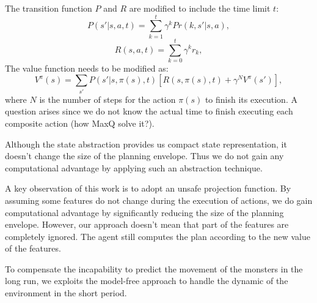 The transition function $P$ and $R$ are modified to include the time limit $t$:
\begin{equation}
    P(s'|s, a, t) = \sum^t_{k=1} \gamma^k Pr(k, s'|s, a),
\end{equation}
\begin{equation}
    R(s, a, t) = \sum^t_{k=0} \gamma^k r_k,
\end{equation}
The value function needs to be modified as:
\begin{equation}
    V^{\pi}(s) = \sum_{s'}P(s'|s, \pi(s), t)[R(s, \pi(s), t) + \gamma^N V^{\pi}(s')],
\end{equation}
where $N$ is the number of steps for the action $\pi(s)$ to finish its execution.
A question arises since we do not know the actual time to finish executing each composite action (how MaxQ solve it?).

Although the state abstraction provides us compact state representation, 
it doesn't change the size of the planning envelope. Thus we do not gain any computational
advantage by applying such an abstraction technique.

A key observation of this work is to adopt an unsafe projection function. By assuming 
some features do not change during the execution of actions, we do gain computational advantage by
significantly reducing the size of the planning envelope. However, our approach doesn't mean that
part of the features are completely ignored. The agent still computes the plan according to 
the new value of the features.


To compensate the incapability to predict the movement of the monsters in the long run, 
we exploits the model-free approach to handle the dynamic of the environment in the short period.


